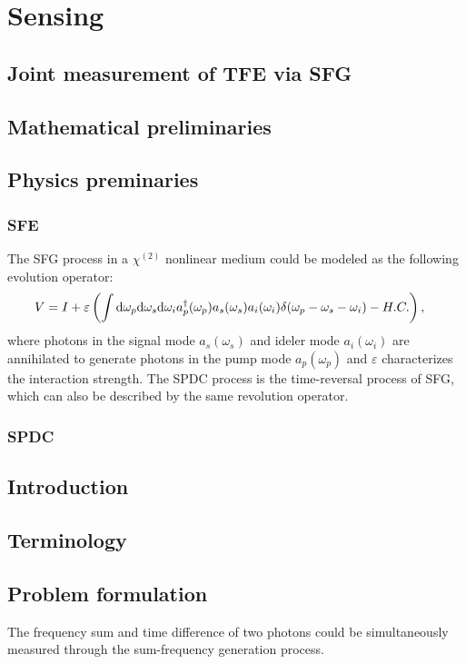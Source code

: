 \documentclass[../../note.tex]{subfiles}
\begin{document}
\chapter{Sensing}
\section{Joint measurement of TFE via SFG}
\section{Mathematical preliminaries}

\section{Physics preminaries}
\subsection{SFE}
The SFG process in a $\chi^{(2)}$ nonlinear medium could be modeled as the following evolution operator:
\begin{align}
    \label{evolution operator of sfg process}
    V
    &= I + \varepsilon\left(\int {\rm d}\omega_p {\rm d}\omega_s{\rm d}\omega_i a_p^\dagger(\omega_p)a_s(\omega_s)a_i(\omega_i)\delta(\omega_p - \omega_s - \omega_i) - H.C. \right),
\end{align}
where photons in the signal mode $a_s(\omega_s)$ and ideler mode $a_i(\omega_i)$ are annihilated to generate photons in the pump mode $a_p(\omega_p)$ and $\varepsilon$ characterizes the interaction strength. The SPDC process is the time-reversal process of SFG, which can also be described by the same revolution operator.

\subsection{SPDC}

\section{Introduction}

\section{Terminology}

\section{Problem formulation}
The frequency sum and time difference of two photons could be simultaneously measured through the sum-frequency generation process.
\end{document}
